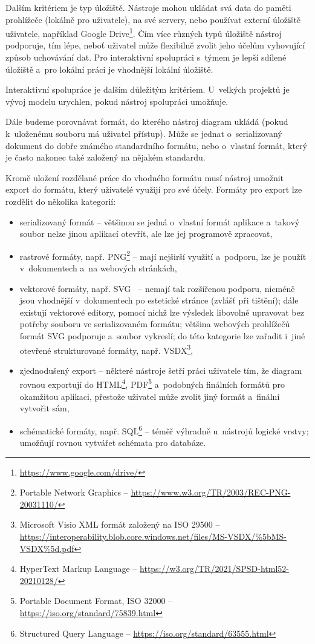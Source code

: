 Dalším kritériem je typ úložiště.
Nástroje mohou ukládat svá data do paměti prohlížeče (lokálně pro uživatele), na své servery, nebo používat externí úložiště uživatele, například Google Drive\footnote{\url{https://www.google.com/drive/}}.
Čím více různých typů úložiště nástroj podporuje, tím lépe, neboť uživatel může flexibilně zvolit jeho účelům vyhovující způsob uchovávání dat.
Pro interaktivní spolupráci s~týmem je lepší sdílené úložiště a~pro lokální práci je vhodnější lokální úložiště.

Interaktivní spolupráce je dalším důležitým kritériem.
U~velkých projektů je vývoj modelu urychlen, pokud nástroj spolupráci umožňuje.

Dále budeme porovnávat formát, do kterého nástroj diagram ukládá (pokud k~uloženému souboru má uživatel přístup).
Může se jednat o~serializovaný dokument do dobře známého standardního formátu, nebo o~vlastní formát, který je často nakonec také založený na nějakém standardu.

Kromě uložení rozdělané práce do vhodného formátu musí nástroj umožnit export do formátu, který uživatelé využijí pro své účely.
Formáty pro export lze rozdělit do několika kategorií:
\begin{itemize}
  \item serializovaný formát -- většinou se jedná o~vlastní formát aplikace a~takový soubor nelze jinou aplikací otevřít, ale lze jej programově zpracovat,
  \item rastrové formáty, např. PNG\footnote{Portable Network Graphics -- \url{https://www.w3.org/TR/2003/REC-PNG-20031110/}} -- mají nejširší využití a~podporu, lze je použít v~dokumentech a~na webových stránkách,
  \item vektorové formáty, např. SVG~\cite{Dirk18} -- nemají tak rozšířenou podporu, nicméně jsou vhodnější v~dokumentech po estetické stránce (zvlášť při tištění);
        dále existují vektorové editory, pomocí nichž lze výsledek libovolně upravovat bez potřeby souboru ve serializovaném formátu;
        většina webových prohlížečů formát SVG podporuje a~soubor vykreslí;
        do této kategorie lze zařadit i~jiné otevřené strukturované formáty, např. VSDX\footnote{Microsoft Visio XML formát založený na ISO 29500 -- \url{https://interoperability.blob.core.windows.net/files/MS-VSDX/\%5bMS-VSDX\%5d.pdf}},
  \item zjednodušený export -- některé nástroje šetří práci uživatele tím, že diagram rovnou exportují do HTML\footnote{HyperText Markup Language -- \url{https://w3.org/TR/2021/SPSD-html52-20210128/}}, PDF\footnote{Portable Document Format, ISO 32000 -- \url{https://iso.org/standard/75839.html}} a~podobných finálních formátů pro okamžitou aplikaci, přestože uživatel může zvolit jiný formát a~finální vytvořit sám,
  \item schématické formáty, např. SQL\footnote{Structured Query Language -- \url{https://iso.org/standard/63555.html}} -- téměř výhradně u~nástrojů lo\-gic\-ké vrst\-vy; umožňují rovnou vytvářet schémata pro databáze.
\end{itemize}

